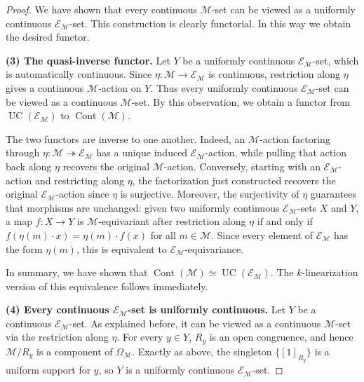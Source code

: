 \documentclass[10pt, reqno]{amsart}
\theoremstyle{plain}
\numberwithin{equation}{section}
\theoremstyle{definition}
\newcommand{\Cont}{\operatorname{Cont}}
\newcommand{\UC}{\operatorname{UC}}
\newcommand{\M}{\mathscr M}
\newcommand{\E}{\mathscr E}
\begin{document}
\begin{proof}
We have shown that every continuous $\M$-set can be viewed as a uniformly continuous $\E_\M$-set. This construction is clearly functorial. In this way we obtain the desired functor.

\medskip
\noindent
\textbf{(3) The quasi-inverse functor.} Let $Y$ be a uniformly continuous $\E_\M$-set, which is automatically continuous. Since $\eta: \M \to \E_\M$ is continuous, restriction along $\eta$ gives a continuous $\M$-action on $Y$. Thus every uniformly continuous $\E_\M$-set can be viewed as a continuous $\M$-set. By this observation, we obtain a functor from $\UC(\E_\M)$ to $\Cont(\M)$.

The two functors are inverse to one another. Indeed, an $\M$-action factoring through $\eta: \M \twoheadrightarrow \E_\M$ has a unique induced $\E_\M$-action, while pulling that action back along $\eta$ recovers the original $\M$-action. Conversely, starting with an $\E_\M$-action and restricting along $\eta$, the factorization just constructed recovers the original $\E_\M$-action since $\eta$ is surjective. Moreover, the surjectivity of $\eta$ guarantees that morphisms are unchanged: given two uniformly continuous $\E_\M$-sets $X$ and $Y$, a map $f: X \to Y$ is $\M$-equivariant after restriction along $\eta$ if and only if $f(\eta(m) \cdot x) = \eta(m) \cdot f(x)$ for all $m \in \M$. Since every element of $\E_\M$ has the form $\eta(m)$, this is equivalent to $\E_\M$-equivariance.

In summary, we have shown that $\Cont(\M) \simeq \UC(\E_\M)$. The $k$-linearization version of this equivalence follows immediately.

\medskip
\noindent
\textbf{(4) Every continuous $\E_\M$-set is uniformly continuous.} Let $Y$ be a continuous $\E_\M$-set. As explained before, it can be viewed as a continuous $\M$-set via the restriction along $\eta$. For every $y \in Y$, $R_y$ is an open congruence, and hence $\M/R_y$ is a component of $\Omega_\M$. Exactly as above, the singleton $\{[1]_{R_y}\}$ is a uniform support for $y$, so $Y$ is a uniformly continuous $\E_\M$-set.
\end{proof}
\end{document}
